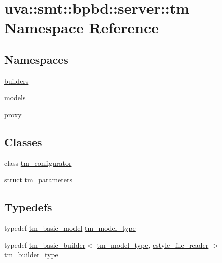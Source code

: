\hypertarget{namespaceuva_1_1smt_1_1bpbd_1_1server_1_1tm}{}\section{uva\+:\+:smt\+:\+:bpbd\+:\+:server\+:\+:tm Namespace Reference}
\label{namespaceuva_1_1smt_1_1bpbd_1_1server_1_1tm}
\subsection*{Namespaces}
\begin{DoxyCompactItemize}
\item 
 \hyperlink{namespaceuva_1_1smt_1_1bpbd_1_1server_1_1tm_1_1builders}{builders}
\item 
 \hyperlink{namespaceuva_1_1smt_1_1bpbd_1_1server_1_1tm_1_1models}{models}
\item 
 \hyperlink{namespaceuva_1_1smt_1_1bpbd_1_1server_1_1tm_1_1proxy}{proxy}
\end{DoxyCompactItemize}
\subsection*{Classes}
\begin{DoxyCompactItemize}
\item 
class \hyperlink{classuva_1_1smt_1_1bpbd_1_1server_1_1tm_1_1tm__configurator}{tm\+\_\+configurator}
\item 
struct \hyperlink{structuva_1_1smt_1_1bpbd_1_1server_1_1tm_1_1tm__parameters}{tm\+\_\+parameters}
\end{DoxyCompactItemize}
\subsection*{Typedefs}
\begin{DoxyCompactItemize}
\item 
typedef \hyperlink{classuva_1_1smt_1_1bpbd_1_1server_1_1tm_1_1models_1_1tm__basic__model}{tm\+\_\+basic\+\_\+model} \hyperlink{namespaceuva_1_1smt_1_1bpbd_1_1server_1_1tm_a2f41d3b9fcee3dddc005fd7e7deae402}{tm\+\_\+model\+\_\+type}
\item 
typedef \hyperlink{classuva_1_1smt_1_1bpbd_1_1server_1_1tm_1_1builders_1_1tm__basic__builder}{tm\+\_\+basic\+\_\+builder}$<$ \hyperlink{namespaceuva_1_1smt_1_1bpbd_1_1server_1_1tm_a2f41d3b9fcee3dddc005fd7e7deae402}{tm\+\_\+model\+\_\+type}, \hyperlink{classuva_1_1utils_1_1file_1_1cstyle__file__reader}{cstyle\+\_\+file\+\_\+reader} $>$ \hyperlink{namespaceuva_1_1smt_1_1bpbd_1_1server_1_1tm_a8217600aaa61d65d5e569fec3b50828b}{tm\+\_\+builder\+\_\+type}
\end{DoxyCompactItemize}


